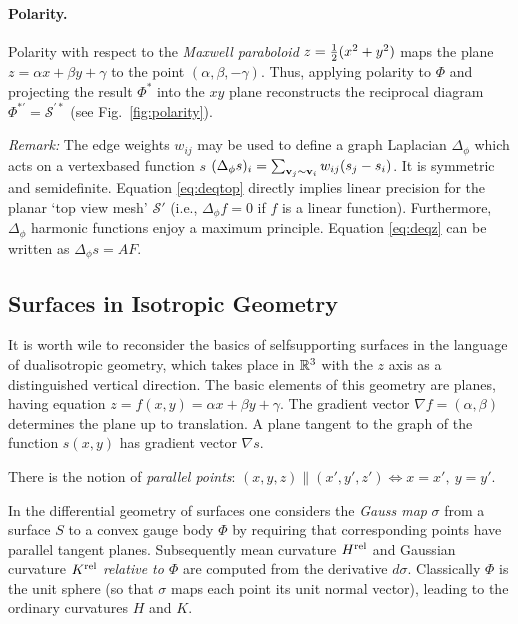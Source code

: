 \documentclass[annual]{acmsiggraph}
\def\rel{{\mathord{\text{\rm rel}}}}
\def\SS{{\mathcal S}}
\begin{document}
\paragraph{Polarity.}

Polarity with respect to the {\em Maxwell paraboloid} $z={1\over 2} 
(x^2+y^2)$ maps the plane $z=\alpha x + \beta y + \gamma$ to the point 
$(\alpha,\beta,-\gamma)$. Thus, applying polarity to $\Phi$ and projecting 
the result $\Phi^*$ into the $xy$ plane reconstructs the 
reciprocal diagram $\Phi^{*\prime}=\SS^{\prime *}$
(see Fig.~\ref{fig:polarity}).

{\it Remark:} The edge weights $w_{ij}$ may be used to define a graph 
Laplacian $\Delta_\phi$ which acts on a vertex\dash based function $s$ 
$(\Delta_{\phi} s)_i=\sum_{{\mathbf v}_j\sim {\mathbf v}_i} w_{ij}(s_j-s_i)$. It is 
symmetric and semidefinite. Equation \eqref{eq:deqtop} directly implies 
linear precision for the planar `top view mesh' $\SS'$ (i.e., $\Delta_\phi 
f=0$ if $f$ is a linear function). Furthermore, $\Delta_\phi$\dash 
harmonic functions enjoy a maximum principle. Equation \eqref{eq:deqz} can 
be written as $\Delta_\phi s = AF$.

\subsection{Surfaces in Isotropic Geometry} \label{sec:smooth}

It is worth wile to reconsider the basics of self\dash supporting surfaces 
in the language of dual\dash isotropic geometry, which takes place in 
${\mathbb R}^3$ with the $z$ axis as a distinguished vertical direction. The basic 
elements of this geometry are planes, having equation $z=f(x,y) = \alpha 
x+\beta y+\gamma$. The gradient vector $\nabla f = (\alpha,\beta)$ 
determines the plane up to translation. A plane tangent to the graph of 
the function $s(x,y)$ has gradient vector $\nabla s$.

There is the notion of {\em parallel points}:
	$
	(x,y,z) \parallel (x',y',z') \iff
	x=x',\ y=y'
	.$

In the differential geometry of surfaces one considers the {\em Gauss map} 
$\sigma$ from a surface $S$ to a convex gauge body $\Phi$ by requiring 
that corresponding points have parallel tangent planes.  Subsequently mean 
curvature $H^\rel$ and Gaussian curvature $K^\rel$ {\em relative to 
$\Phi$} are computed from the derivative $d\sigma$. Classically $\Phi$ is 
the unit sphere (so that $\sigma$ maps each point its unit normal vector), 
leading to the ordinary curvatures $H$ and $K$.
\end{document}

